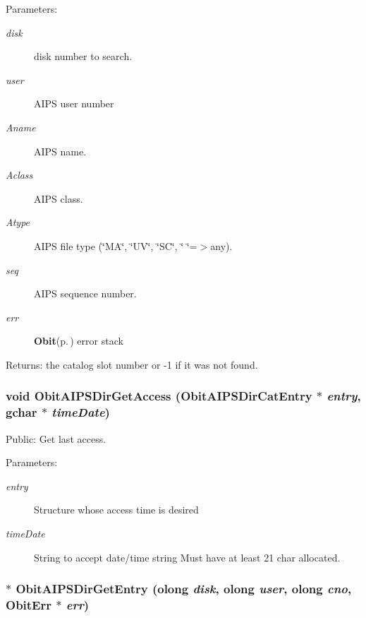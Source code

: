 \begin{Desc}
\item[Parameters:]
\begin{description}
\item[{\em disk}]disk number to search. \item[{\em user}]AIPS user number \item[{\em Aname}]AIPS name. \item[{\em Aclass}]AIPS class. \item[{\em Atype}]AIPS file type (\char`\"{}MA\char`\"{}, \char`\"{}UV\char`\"{}, \char`\"{}SC\char`\"{}, \char`\"{}  \char`\"{}=$>$any). \item[{\em seq}]AIPS sequence number. \item[{\em err}]{\bf Obit}{\rm (p.\,\pageref{structObit})} error stack \end{description}
\end{Desc}
\begin{Desc}
\item[Returns:]the catalog slot number or -1 if it was not found. \end{Desc}
\subsubsection{\setlength{\rightskip}{0pt plus 5cm}void Obit\-AIPSDir\-Get\-Access ({\bf Obit\-AIPSDir\-Cat\-Entry} $\ast$ {\em entry}, gchar $\ast$ {\em time\-Date})}\label{ObitAIPSDir_8h_a17}


Public: Get last access. 

\begin{Desc}
\item[Parameters:]
\begin{description}
\item[{\em entry}]Structure whose access time is desired \item[{\em time\-Date}]String to accept date/time string Must have at least 21 char allocated. \end{description}
\end{Desc}
\subsubsection{$\ast$ Obit\-AIPSDir\-Get\-Entry ({\bf olong} {\em disk}, {\bf olong} {\em user}, {\bf olong} {\em cno}, {\bf Obit\-Err} $\ast$ {\em err})}\label{ObitAIPSDir_8h_a16}


